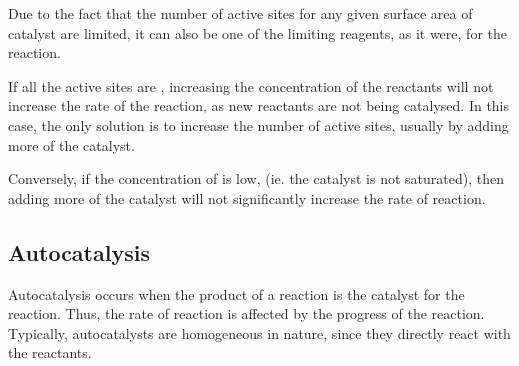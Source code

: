 				Due to the fact that the number of active sites for any given surface area of catalyst are limited, it can also be one of
				the limiting reagents, as it were, for the reaction.

				If all the active sites are , increasing the concentration of the reactants will not increase the rate of
				the reaction, as new reactants are not being catalysed. In this case, the only solution is to increase the number of active
				sites, usually by adding more of the catalyst.

				Conversely, if the concentration of  is low, (ie. the catalyst is not saturated), then adding more of the catalyst
				will not significantly increase the rate of reaction.



		\subsection{Autocatalysis}

			Autocatalysis occurs when the product of a reaction is the catalyst for the reaction. Thus, the rate of reaction is affected
			by the progress of the reaction. Typically, autocatalysts are homogeneous in nature, since they directly react with the reactants.



